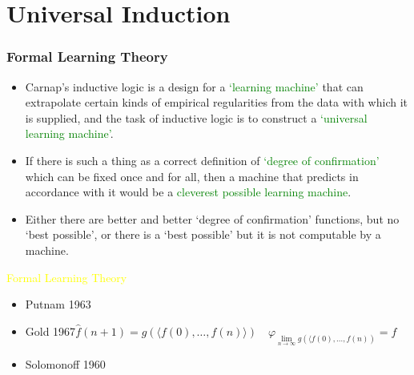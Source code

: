 \documentclass[UTF8,11pt,colorlinks,compress,openany]{beamer}%
\begin{document}
\section{Universal Induction}

\begin{frame}\frametitle{Formal Learning Theory}
\begin{itemize}
	\item Carnap's inductive logic is a design for a \textcolor{green}{`learning machine'} that can extrapolate certain kinds of empirical regularities from the data with which it is supplied, and the task of inductive logic is to construct a \textcolor{green}{`universal learning machine'}.
	\item If there is such a thing as a correct definition of \textcolor{green}{`degree of confirmation'} which can be fixed once and for all, then a machine that predicts in accordance with it would be a \textcolor{green}{cleverest possible learning machine}.
	\item Either there are better and better `degree of confirmation' functions, but no `best possible', or there is a `best possible' but it is not computable by a machine.
\end{itemize}
\textcolor{yellow}{Formal Learning Theory}
\begin{itemize}
	\item Putnam 1963
	\item Gold 1967\quad $\hat{f}(n+1)=g(\langle f(0),\ldots,f(n)\rangle)\quad\varphi_{\lim\limits_{n\to\infty}g(\langle f(0),\dots,f(n))}=f$
	\item Solomonoff 1960
\end{itemize}
\end{frame}
\end{document}
